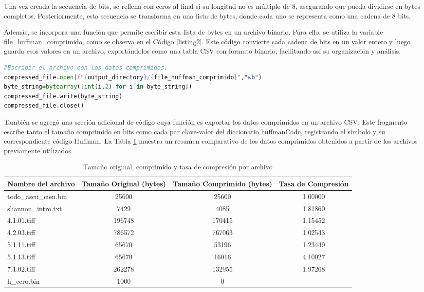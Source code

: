 \documentclass[conference,onecolumn,12pt]{IEEEtran}
\numberwithin{equation}{subsection}
\begin{document}
Una vez creada la secuencia de bits, se rellena con ceros al final si su longitud no es múltiplo de 8, asegurando que pueda dividirse en bytes completos. Posteriormente, esta secuencia se transforma en una lista de bytes, donde cada uno se representa como una cadena de 8 bits.

Además, se incorpora una función que permite escribir esta lista de bytes en un archivo binario. Para ello, se utiliza la variable file\_huffman\_comprimido, como se observa en el Código \ref{listing2}. Este código convierte cada cadena de bits en un valor entero y luego guarda esos valores en un archivo, exportándolos como una tabla CSV con formato binario, facilitando así su organización y análisis.



\begin{lstlisting}[language=Python, caption={Función de lista en archivo binario usando file\_huffman\_comprimido}, label={listing2}]
#Escribir el archivo con los datos comprimidos.
compressed_file=open(f"{output_directory}/{file_huffman_comprimido}","wb")
byte_string=bytearray([int(i,2) for i in byte_string])
compressed_file.write(byte_string)
compressed_file.close()
\end{lstlisting}

También se agregó una sección adicional de código cuya función es exportar los datos comprimidos en un archivo CSV. Este fragmento escribe tanto el tamaño comprimido en bits como cada par clave-valor del diccionario huffmanCode, registrando el símbolo y su correspondiente código Huffman. La Tabla \ref{tab:compression_stats}  muestra un resumen comparativo de los datos comprimidos obtenidos a partir de los archivos previamente utilizados.

\begin{table}[H]
    \centering
    \caption{Tamaño original, comprimido y tasa de compresión por archivo}
    \label{tab:compression_stats}
    \begin{tabular}{lccc}
        \toprule
        \textbf{Nombre del archivo} & \textbf{Tamaño Original (bytes)} & \textbf{Tamaño Comprimido (bytes)} & \textbf{Tasa de Compresión} \\
        \midrule
        todo\_ascii\_cien.bin & 25600  & 25600  & 1.00000 \\
        shannon\_intro.txt    & 7429   & 4085   & 1.81860 \\
        4.1.01.tiff 		  & 196748 & 170415 & 1.15452 \\
        4.2.03.tiff 		  & 786572 & 767063 & 1.02543 \\
        5.1.11.tiff			  & 65670  & 53196  & 1.23449 \\
        5.1.13.tiff 	   	  & 65670  & 16016  & 4.10027 \\
        7.1.02.tiff 		  & 262278 & 132955 & 1.97268 \\
        h\_cero.bin 		  & 1000   & 0      & - \\
        \bottomrule 
    \end{tabular}
\end{table}
\end{document}
